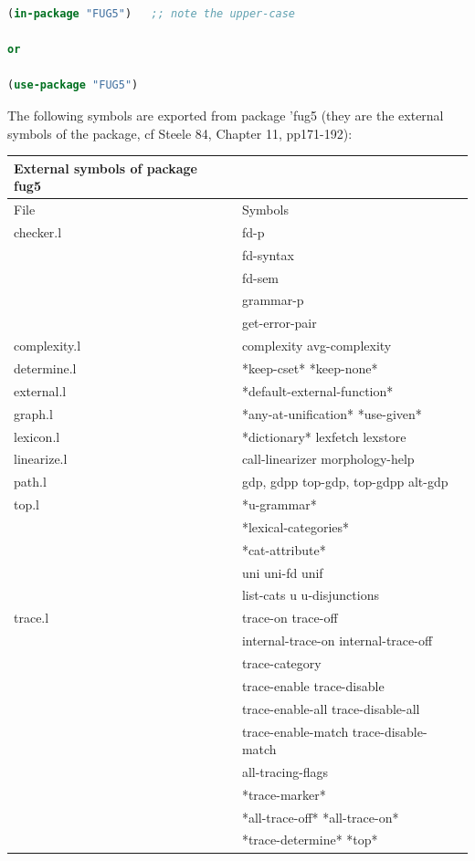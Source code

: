 \documentclass[10pt,a4paper]{report}
\begin{document}
\begin{appendices}
\begin{lstlisting}[language=Lisp]
(in-package "FUG5")   ;; note the upper-case

or

(use-package "FUG5")
\end{lstlisting}

The following symbols are exported from package 'fug5 (they are 
the external symbols of the package, cf {Steele 84, Chapter 11,
pp171-192}): 

\begin{center}
\begin{tabular}{|l|l|}
\hline
External symbols of package fug5 \\ \hline
File & Symbols \\ \hline

checker.l&fd-p\\
& fd-syntax\\
& fd-sem\\
& grammar-p\\
& get-error-pair \\ \hline

complexity.l&complexity
avg-complexity \\ \hline

determine.l&*keep-cset*
*keep-none* \\ \hline

external.l&*default-external-function* \\ \hline

graph.l&*any-at-unification*
*use-given* \\ \hline

lexicon.l&*dictionary*
lexfetch
lexstore \\ \hline

linearize.l&call-linearizer
morphology-help \\ \hline

path.l&gdp, gdpp
top-gdp, top-gdpp
alt-gdp \\ \hline

top.l&*u-grammar*\\
&*lexical-categories*\\
&*cat-attribute*\\
&uni
uni-fd
unif\\
&list-cats
u
u-disjunctions \\ \hline

trace.l&trace-on trace-off\\
& internal-trace-on internal-trace-off\\
& trace-category\\
& trace-enable trace-disable\\
& trace-enable-all trace-disable-all \\
& trace-enable-match trace-disable-match \\
& all-tracing-flags \\
& *trace-marker* \\
& *all-trace-off* *all-trace-on* \\
& *trace-determine* *top* \\ \hline


\end{tabular}
\end{center}
\end{appendices}
\end{document}
